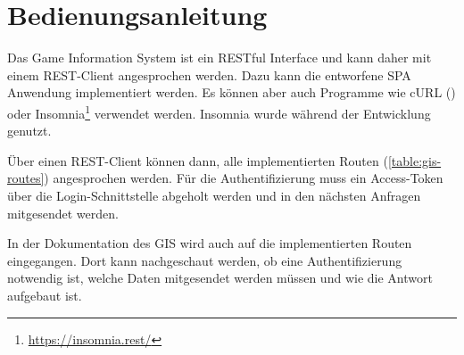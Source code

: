 \section{Bedienungsanleitung}

Das Game Information System ist ein RESTful Interface und kann daher mit einem REST-Client angesprochen werden. Dazu kann die entworfene SPA Anwendung implementiert werden. Es können aber auch Programme wie cURL () oder Insomnia\footnote{\url{https://insomnia.rest/}} verwendet werden. Insomnia wurde während der Entwicklung genutzt.

Über einen REST-Client können dann, alle implementierten Routen (\autoref{table:gis-routes}) angesprochen werden. Für die Authentifizierung muss ein Access-Token über die Login-Schnittstelle abgeholt werden und in den nächsten Anfragen mitgesendet werden.

In der Dokumentation des GIS wird auch auf die implementierten Routen eingegangen. Dort kann nachgeschaut werden, ob eine Authentifizierung notwendig ist, welche Daten mitgesendet werden müssen und wie die Antwort aufgebaut ist.
